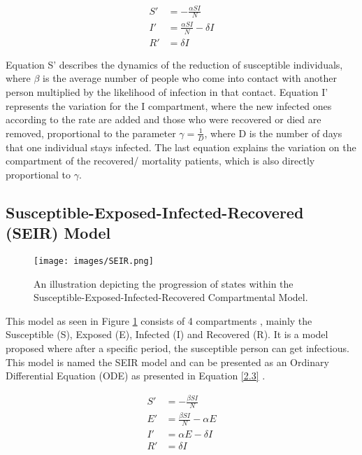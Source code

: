 \begin{equation}
	\begin{split}
		S' &= -\frac{\alpha SI}{N}\\
		I' &= \frac{\alpha SI}{N} - \delta I \\
		R' &= \delta I		
		\label{2.2}
	\end{split}
\end{equation}


Equation S' describes the dynamics of the reduction of susceptible individuals, where $\beta$ is the average number of people who come into contact with another person multiplied by the likelihood of infection in that contact.\cite{abouismail_2020_compartmental} Equation I' represents the variation for the I compartment, where the new infected ones according to the rate are added and those who were recovered or died are removed, proportional to the parameter $\gamma = \frac{1}{D}$, where D is the number of days that one individual stays infected. The last equation explains the variation on the compartment of the recovered/ mortality patients, which is also directly proportional to $\gamma$. 

\subsection{Susceptible-Exposed-Infected-Recovered (SEIR) Model}
\begin{figure}[H]
	\centering
{\texttt{[image: images/SEIR.png]}}
\caption{An illustration depicting the progression of states within the Susceptible-Exposed-Infected-Recovered Compartmental Model. }%
	\label{fig:3}
\end{figure}

This model as seen in Figure \ref{fig:3} consists of 4 compartments \cite{bjrnstad-2020}, mainly the Susceptible (S), Exposed (E), Infected (I) and Recovered (R). It is a model proposed where after a specific period, the susceptible person can get infectious. This model is named the SEIR model and can be presented as an Ordinary Differential Equation (ODE) as presented in Equation \ref{2.3} . 

\begin{equation}
	\begin{split}
		S' &= -\frac{\beta SI}{N}\\
		E' &= \frac{\beta SI}{N} - \alpha E \\
		I' &=  \alpha E - \delta I \\
		R' &= \delta I 
		\label{2.3}  	
	\end{split}
\end{equation}


